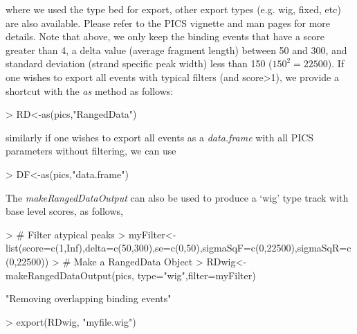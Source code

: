 \documentclass[12pt]{article}
\newcommand{\Rfunction}[1]{{\textit{#1}}}
\newcommand{\Rmethod}[1]{\textit{#1}}
\newcommand{\Rclass}[1]{{\textit{#1}}}
\begin{document}
where we used the type bed for export, other export types (e.g. wig, fixed, etc) are also available. Please refer to the PICS vignette and man pages for more details.
Note that above, we only keep the binding events that have a score greater than 4, a delta value (average fragment length) between 50 and 300, and standard deviation (strand specific peak width) less than 150 ($150^2=22500$). 
If one wishes to export all events with typical filters (and score>1), we provide a shortcut with the \Rmethod{as} method as follows:
\begin{Schunk}
\begin{Sinput}
> RD<-as(pics,"RangedData")
\end{Sinput}
\end{Schunk}
similarly if one wishes to export all events as a \Rclass{data.frame} with all PICS parameters without filtering, we can use
\begin{Schunk}
\begin{Sinput}
> DF<-as(pics,"data.frame")
\end{Sinput}
\end{Schunk}
The \Rfunction{makeRangedDataOutput} can also be used to produce a `wig' type track with base level scores, as follows,
\begin{Schunk}
\begin{Sinput}
> # Filter atypical peaks
> myFilter<-list(score=c(1,Inf),delta=c(50,300),se=c(0,50),sigmaSqF=c(0,22500),sigmaSqR=c(0,22500))
> # Make a RangedData Object
> RDwig<-makeRangedDataOutput(pics, type="wig",filter=myFilter)
\end{Sinput}
\begin{Soutput}
[1] "Removing overlapping binding events"
\end{Soutput}
\begin{Sinput}
> export(RDwig, "myfile.wig")
\end{Sinput}
\end{Schunk}
\end{document}
